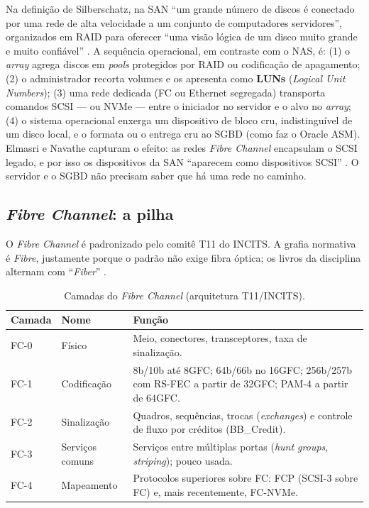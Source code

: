 \documentclass[11pt,a4paper]{article}
\begin{document}
Na definição de Silberschatz, na SAN ``um grande número de discos é conectado por uma rede de alta
velocidade a um conjunto de computadores servidores'', organizados em RAID para oferecer ``uma visão
lógica de um disco muito grande e muito confiável'' \cite{silberschatz2020}. A sequência operacional,
em contraste com o NAS, é: (1) o \textit{array} agrega discos em \textit{pools} protegidos por RAID ou
codificação de apagamento; (2) o administrador recorta volumes e os apresenta como \textbf{LUNs}
(\textit{Logical Unit Numbers}); (3) uma rede dedicada (FC ou Ethernet segregada) transporta comandos
SCSI --- ou NVMe --- entre o iniciador no servidor e o alvo no \textit{array}; (4) o sistema operacional
enxerga um dispositivo de bloco cru, indistinguível de um disco local, e o formata ou o entrega cru ao
SGBD (como faz o Oracle ASM). Elmasri e Navathe capturam o efeito: as redes \textit{Fibre Channel}
encapsulam o SCSI legado, e por isso os dispositivos da SAN ``aparecem como dispositivos SCSI''
\cite{elmasri2018}. O servidor e o SGBD não precisam saber que há uma rede no caminho.

\subsection{\textit{Fibre Channel}: a pilha}
\label{sec:fc}

O \textit{Fibre Channel} é padronizado pelo comitê T11 do INCITS. A grafia normativa é
\textit{Fibre}, justamente porque o padrão não exige fibra óptica; os livros da disciplina alternam com
``\textit{Fiber}'' \cite{elmasri2018,silberschatz2020}.

\begin{table}[H]
\centering
\caption{Camadas do \textit{Fibre Channel} (arquitetura T11/INCITS).}
\label{tab:fcpilha}
{\footnotesize
\begin{tabular}{@{}L{1.3cm}L{2.2cm}L{11.3cm}@{}}
\toprule
\textbf{Camada} & \textbf{Nome} & \textbf{Função} \\
\midrule
FC-0 & Físico & Meio, conectores, transceptores, taxa de sinalização. \\
FC-1 & Codificação & 8b/10b até 8GFC; 64b/66b no 16GFC; 256b/257b com RS-FEC a partir de 32GFC; PAM-4 a partir de 64GFC. \\
FC-2 & Sinalização & Quadros, sequências, trocas (\textit{exchanges}) e controle de fluxo por créditos (BB\_Credit). \\
FC-3 & Serviços comuns & Serviços entre múltiplas portas (\textit{hunt groups}, \textit{striping}); pouco usada. \\
FC-4 & Mapeamento & Protocolos superiores sobre FC: FCP (SCSI-3 sobre FC) e, mais recentemente, FC-NVMe. \\
\bottomrule
\end{tabular}}
\end{table}
\end{document}
